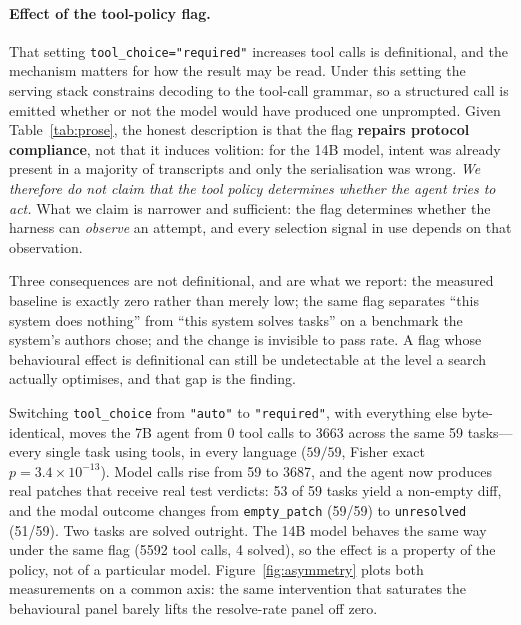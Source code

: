 \documentclass{article}
\begin{document}
\paragraph{Effect of the tool-policy flag.}
That setting \texttt{tool\_choice="required"} increases tool calls is
definitional, and the mechanism matters for how the result may be read. Under
this setting the serving stack constrains decoding to the tool-call grammar,
so a structured call is emitted whether or not the model would have produced
one unprompted. Given Table~\ref{tab:prose}, the honest description is that
the flag \textbf{repairs protocol compliance}, not that it induces volition:
for the 14B model, intent was already present in a majority of transcripts
and only the serialisation was wrong. \emph{We therefore do not claim that
the tool policy determines whether the agent tries to act.} What we claim is
narrower and sufficient: the flag determines whether the harness can
\emph{observe} an attempt, and every selection signal in use depends on that
observation.

Three consequences are not definitional, and are what we report: the measured
baseline is exactly zero rather than merely low; the same flag separates
``this system does nothing'' from ``this system solves tasks'' on a benchmark
the system's authors chose; and the change is invisible to pass rate. A flag
whose behavioural effect is definitional can still be undetectable at the
level a search actually optimises, and that gap is the finding.

Switching \texttt{tool\_choice} from \texttt{"auto"} to \texttt{"required"},
with everything else byte-identical, moves the 7B agent from 0 tool calls to
3663 across the same 59 tasks---every single task using tools, in every
language ($59/59$, Fisher exact $p = 3.4\times10^{-13}$). Model calls rise
from 59 to 3687, and the agent now produces real patches that receive real
test verdicts: 53 of 59 tasks yield a non-empty diff, and the modal outcome
changes from \texttt{empty\_patch} (59/59) to \texttt{unresolved} (51/59).
Two tasks are solved outright. The 14B model behaves the same way under the
same flag (5592 tool calls, 4 solved), so the effect is a property of the
policy, not of a particular model. Figure~\ref{fig:asymmetry} plots both
measurements on a common axis: the same intervention that saturates the
behavioural panel barely lifts the resolve-rate panel off zero.
\end{document}
